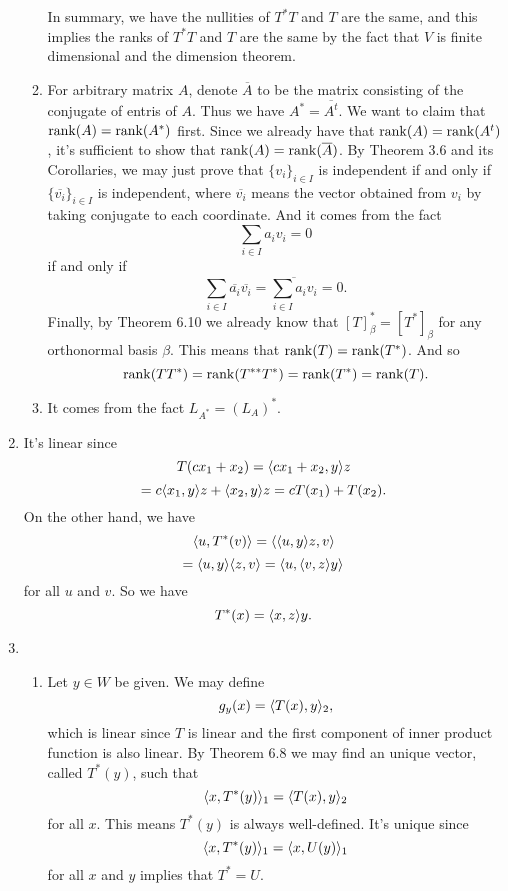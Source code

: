 \begin{enumerate}
\begin{enumerate}
In summary, we have the nullities of $T^*T$ and $T$ are the same, and this implies the ranks of $T^*T$ and $T$ are the same by the fact that $V$ is finite dimensional and the dimension theorem.
\item For arbitrary matrix $A$, denote $\overline{A}$ to be the matrix consisting of the conjugate of entris of $A$. Thus we have $A^*=\overline{A^t}$. We want to claim that $\operatorname{rank}(A)=\operatorname{rank}(A^*)$ first. Since we already have that $\operatorname{rank}(A)=\operatorname{rank}(A^t)$, it's sufficient to show that $\operatorname{rank}(A)=\operatorname{rank}(\overline{A})$. By Theorem 3.6 and its Corollaries, we may just prove that $\{v_i\}_{i\in I}$ is independent if and only if $\{\overline{v_i}\}_{i\in I}$ is independent, where $\overline{v_i}$ means the vector obtained from $v_i$ by taking conjugate to each coordinate. And it comes from the fact 
\[\sum_{i\in I}a_iv_i=0\]
if and only if 
\[\sum_{i\in I}\overline{a_i}\overline{v_i}=\overline{\sum_{i\in I}a_iv_i}=0.\]
Finally, by Theorem 6.10 we already know that $[T]_{\beta}^*=[T^*]_{\beta}$ for any orthonormal basis $\beta$. This means that $\operatorname{rank}(T)=\operatorname{rank}(T^*)$. And so 
\[\operatorname{rank}(TT^*)=\operatorname{rank}(T^{**}T^*)=\operatorname{rank}(T^*)=\operatorname{rank}(T).\]
\item It comes from the fact $L_{A^*}=(L_A)^*$.
\end{enumerate}
\item It's linear since 
\[T(cx_1+x_2)=\langle cx_1+x_2,y\rangle z\]
\[=c\langle x_1,y\rangle z+\langle x_2,y\rangle z=cT(x_1)+T(x_2).\]
On the other hand, we have 
\[\langle u,T^*(v)\rangle =\langle \langle u,y\rangle z,v\rangle \]
\[=\langle u,y\rangle \langle z,v\rangle =\langle u,\langle v,z\rangle y\rangle \]
for all $u$ and $v$. So we have 
\[T^*(x)=\langle x,z\rangle y.\]
\item \begin{enumerate}
\item Let $y\in W$ be given. We may define 
\[g_y(x) =\langle T(x),y\rangle_2,\] 
which is linear since $T$ is linear and the first component of inner product function is also linear. By Theorem 6.8 we may find an unique vector, called $T^*(y)$, such that 
\[\langle x,T^*(y)\rangle_1 =\langle T(x),y\rangle_2\]
for all $x$. This means $T^*(y)$ is always well-defined. It's unique since 
\[\langle x,T^*(y)\rangle_1 =\langle x,U(y)\rangle_1\]
for all $x$ and $y$ implies that $T^*=U$.


\end{enumerate}
\end{enumerate}
